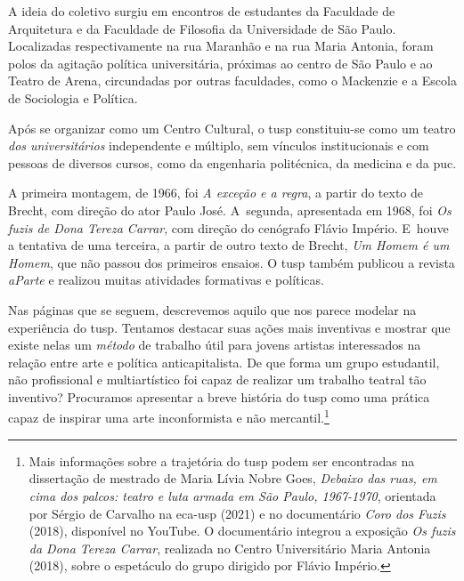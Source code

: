 A ideia do coletivo surgiu em encontros de estudantes da
Faculdade de Arquitetura e da Faculdade de Filosofia da
Universidade de São Paulo. Localizadas respectivamente na rua Maranhão e
na rua Maria Antonia, foram polos da agitação política universitária,
próximas ao centro de São Paulo e ao Teatro de Arena, circundadas por
outras faculdades, como o Mackenzie e a Escola de Sociologia e Política.

Após se organizar como um Centro Cultural, o {\sc tusp} constituiu-se como um
teatro {\it dos universitários} independente e múltiplo, sem vínculos
institucionais e com pessoas de diversos cursos, como da engenharia
politécnica, da medicina e da {\sc puc}.


A primeira montagem, de 1966, foi {\it A exceção e a regra}, a partir do
texto de Brecht, com direção do ator Paulo José. A~segunda, apresentada
em 1968, foi {\it Os fuzis de Dona Tereza Carrar}, com direção do
cenógrafo Flávio Império. E~houve a tentativa de uma terceira, a partir
de outro texto de Brecht, {\it Um Homem é um Homem}, que não passou dos
primeiros ensaios. O {\sc tusp} também publicou a revista {\it aParte} e realizou
muitas atividades formativas e políticas.

Nas páginas que se seguem, descrevemos aquilo que nos parece modelar na
experiência do {\sc tusp}. Tentamos destacar suas ações mais inventivas e
mostrar que existe nelas um {\it método} de trabalho útil para jovens
artistas interessados na relação entre arte e política anticapitalista.
De que forma um grupo estudantil, não profissional e multiartístico foi
capaz de realizar um trabalho teatral tão inventivo? Procuramos
apresentar a breve história do {\sc tusp} como uma prática capaz de inspirar
uma arte inconformista e não mercantil.\footnote{Mais informações sobre a trajetória do {\sc tusp} podem ser encontradas na dissertação de mestrado de Maria Lívia Nobre Goes, {\it Debaixo das ruas, em cima dos palcos: teatro e luta armada em São Paulo, 1967-1970}, orientada por Sérgio de Carvalho na {\sc eca-usp} (2021) e no documentário {\it Coro dos Fuzis} (2018), disponível no YouTube. O documentário integrou a exposição {\it Os fuzis da Dona Tereza Carrar}, realizada no Centro Universitário Maria Antonia (2018), sobre o espetáculo do grupo dirigido por Flávio Império.}

